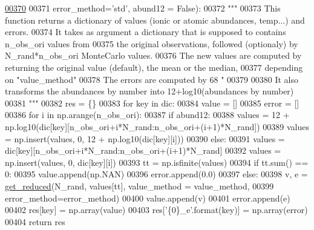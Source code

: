\begin{DoxyCode}
\hypertarget{namespacepyneb_1_1utils_1_1misc_l00370}{}\hyperlink{namespacepyneb_1_1utils_1_1misc_ad6fc4e32ea4c076ac81e99b5c1e74f13}{00370} 
00371                     error\_method=\textcolor{stringliteral}{'std'}, abund12 = \textcolor{keyword}{False}):
00372     \textcolor{stringliteral}{"""}
00373 \textcolor{stringliteral}{    This function returns a dictionary of values (ionic or atomic abundances, temp...) and errors.}
00374 \textcolor{stringliteral}{    It takes as argument a dictionary that is supposed to contains n\_obs\_ori values from}
00375 \textcolor{stringliteral}{        the original observations, followed (optionaly) by N\_rand*n\_obs\_ori MonteCarlo values.}
00376 \textcolor{stringliteral}{    The new values are computed by returning the original value (default), the mean or the median, }
00377 \textcolor{stringliteral}{        depending on "value\_method"}
00378 \textcolor{stringliteral}{    The errors are computed by 68%
      "}
00379 \textcolor{stringliteral}{    }
00380 \textcolor{stringliteral}{    It also transforms the abundances by number into 12+log10(abundances by number)}
00381 \textcolor{stringliteral}{    """}
00382     res = \{\}
00383     \textcolor{keywordflow}{for} key \textcolor{keywordflow}{in} dic:
00384         value = []
00385         error = []
00386         \textcolor{keywordflow}{for} i \textcolor{keywordflow}{in} np.arange(n\_obs\_ori):
00387             \textcolor{keywordflow}{if} abund12:
00388                 values = 12 + np.log10(dic[key][n\_obs\_ori+i*N\_rand:n\_obs\_ori+(i+1)*N\_rand])
00389                 values = np.insert(values, 0, 12 + np.log10(dic[key][i]))
00390             \textcolor{keywordflow}{else}:
00391                 values = dic[key][n\_obs\_ori+i*N\_rand:n\_obs\_ori+(i+1)*N\_rand]
00392                 values = np.insert(values, 0, dic[key][i])
00393             tt = np.isfinite(values)
00394             \textcolor{keywordflow}{if} tt.sum() == 0:
00395                 value.append(np.NAN)
00396                 error.append(0.0)
00397             \textcolor{keywordflow}{else}:
00398                 v, e = \hyperlink{namespacepyneb_1_1utils_1_1misc_ae69de9c9e8f8bde114b8edd326f3b993}{get\_reduced}(N\_rand, values[tt], value\_method = value\_method, 
00399                                    error\_method=error\_method)
00400                 value.append(v)
00401                 error.append(e)
00402         res[key] = np.array(value)
00403         res[\textcolor{stringliteral}{'\{0\}\_e'}.format(key)] = np.array(error)
00404     \textcolor{keywordflow}{return} res

\end{DoxyCode}
